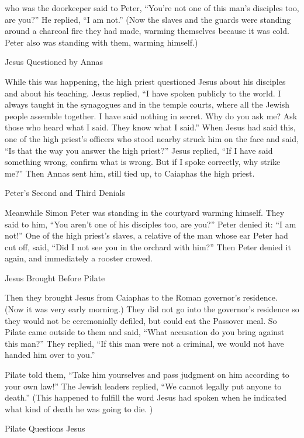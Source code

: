 {who was the doorkeeper
said
to Peter,
“You’re
not
one of
this
man’s
disciples
too,
are you?” He
replied, “I am
not.”
(Now
the slaves
and
the guards
were standing around
a charcoal fire
they had made,
warming
themselves because
it was
cold.
Peter
also
was standing
with
them,
warming himself.)
\par }{\SH Jesus Questioned by Annas
\par }{\PP {}While this was happening, the high priest
questioned
Jesus
about
his
disciples
and
about
his
teaching.
Jesus
replied, “I
have spoken
publicly
to the world.
I
always
taught
in
the synagogues
and
in
the temple courts,
where
all
the Jewish people
assemble together.
I have said
nothing
in
secret.
Why
do you ask
me? Ask
those who heard
what
I said.
They
know
what
I
said.”
When
Jesus
had said
this,
one
of the high priest’s officers
who stood nearby
struck
him
on the face
and said, “Is that the way
you answer
the high priest?”
Jesus
replied, “If
I have said
something wrong,
confirm
what is
wrong.
But
if
I spoke correctly,
why
strike
me?”
Then
Annas
sent
him,
still tied up,
to
Caiaphas
the high priest.
\par }{\SH Peter’s Second and Third Denials
\par }{\PP {}Meanwhile
Simon
Peter
was standing
in the courtyard warming
himself. They said
to him,
“You
aren’t
one of
his
disciples
too, are you?” Peter denied
it: “I am
not!”
One
of
the high priest’s
slaves,
a relative
of the man whose
ear
Peter
had cut off,
said,
“Did
I
not
see
you
in
the orchard
with
him?”
Then
Peter
denied
it again,
and
immediately
a rooster
crowed.
\par }{\SH Jesus Brought Before Pilate
\par }{\PP {}Then
they brought
Jesus
from
Caiaphas
to
the Roman governor’s residence.
(Now
it was
very early morning.) They
did
not
go
into
the governor’s residence
so
they would
not
be ceremonially defiled,
but
could eat
the Passover meal.
So
Pilate
came
outside
to
them
and
said,
“What
accusation
do you bring
against this
man?”
They replied, “If
this man
were
not
a criminal,
we would
not
have handed
him
over
to you.”
\par }{\PP {}Pilate
told
them, “Take
him
yourselves
and
pass judgment
on him
according to
your
own law!” The Jewish leaders
replied, “We
cannot
legally
put
anyone
to death.”
(This happened to fulfill
the word
Jesus
had spoken
when he indicated
what kind
of death
he was going
to die. )
\par }{\SH Pilate Questions Jesus
}

